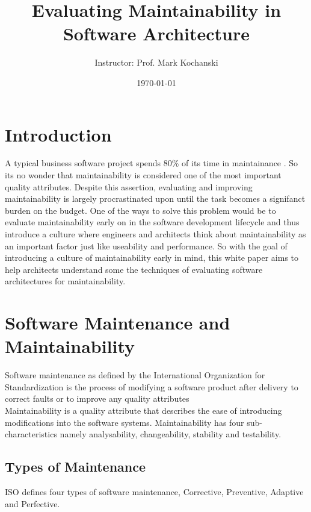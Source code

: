 \documentclass[15pt]{article}
\title{Evaluating Maintainability in Software Architecture}
\author{\Author \and
Instructor: Prof. Mark Kochanski}
\date{\today}
\begin{document}



\maketitle

\newpage

\section{Introduction}
A typical business software project spends 80\% of its time in maintainance \cite{pigoski_practical_1996}. So its no wonder that maintainability is considered one of the most important quality attributes. Despite this assertion, evaluating and improving maintainability is largely procrastinated upon until the task becomes a signifanct burden on the budget. One of the ways to solve this problem would be to evaluate maintainability early on in the software development lifecycle and thus introduce a culture where engineers and architects think about maintainability as an important factor just like useability and performance. So with the goal of introducing a culture of maintainability early in mind, this white paper aims to help architects understand some the techniques of evaluating software architectures for maintainability.


\section{Software Maintenance and Maintainability}
Software maintenance as defined by the International Organization for Standardization is the process of modifying a software product after delivery to correct faults or to improve any quality attributes \cite{iso_international_2006} \\

Maintainability is a quality attribute that describes the ease of introducing modifications into the software systems. Maintainability has four sub-characteristics namely analysability, changeability, stability and testability\cite{iso_international_2006}.\\

\subsection{Types of Maintenance}
ISO defines four types of software maintenance, Corrective, Preventive, Adaptive and Perfective. \\
\end{document}
